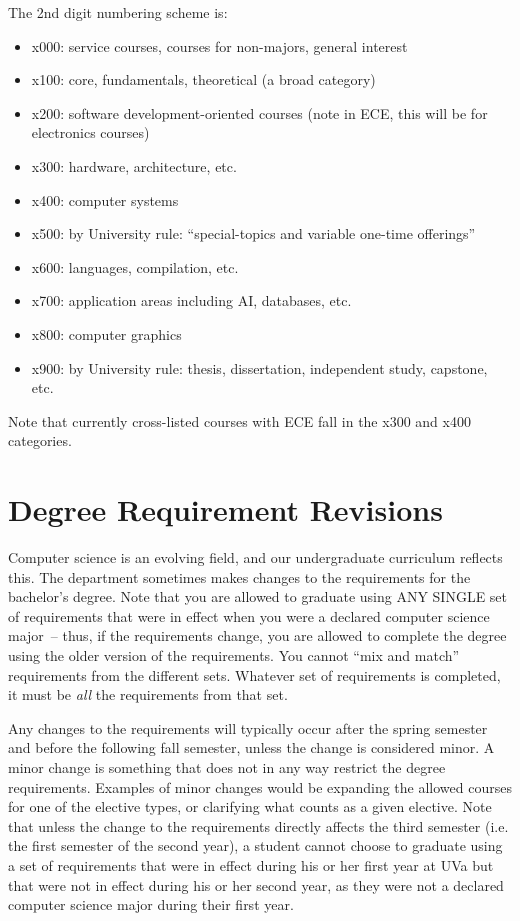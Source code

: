 \documentclass[10pt,letter,twocolumn]{book}
\newenvironment{itemlist}{
\begin{itemize}
\setlength{\itemsep}{0pt}
\setlength{\parskip}{0pt}}
{\end{itemize}}
\newcommand{\mysection}[1]{\section{#1}\renewcommand{\rightmark}{#1}}
\begin{document}
The 2nd digit numbering scheme is:

\begin{itemlist}
\item x000: service courses, courses for non-majors, general interest
\item x100: core, fundamentals, theoretical (a broad category)
\item x200: software development-oriented courses (note in ECE, this will
 be for electronics courses)
\item x300: hardware, architecture, etc.
\item x400: computer systems
\item x500: by University rule: ``special-topics and variable one-time
 offerings''
\item x600: languages, compilation, etc.
\item x700: application areas including AI, databases, etc.
\item x800: computer graphics
\item x900: by University rule: thesis, dissertation, independent
 study, capstone, etc.
\end{itemlist}

Note that currently cross-listed courses with ECE fall in the x300 and
x400 categories.

\mysection{Degree Requirement Revisions}
\label{sec:degreerevisions}

Computer science is an evolving field, and our undergraduate
curriculum reflects this. The department sometimes makes changes to
the requirements for the bachelor's degree. Note that you are allowed
to graduate using ANY SINGLE set of requirements that were in effect
when you were a declared computer science major~-- thus, if the
requirements change, you are allowed to complete the degree using the
older version of the requirements. You cannot ``mix and match''
requirements from the different sets. Whatever set of requirements is
completed, it must be {\em all} the requirements from that set.

Any changes to the requirements will typically occur after the spring
semester and before the following fall semester, unless the change is
considered minor. A minor change is something that does not in any way
restrict the degree requirements. Examples of minor changes would be
expanding the allowed courses for one of the elective types, or
clarifying what counts as a given elective. Note that unless the
change to the requirements directly affects the third semester (i.e.
the first semester of the second year), a student cannot choose to
graduate using a set of requirements that were in effect during his or
her first year at UVa but that were not in effect during his or her
second year, as they were not a declared computer science major during
their first year.
\end{document}
